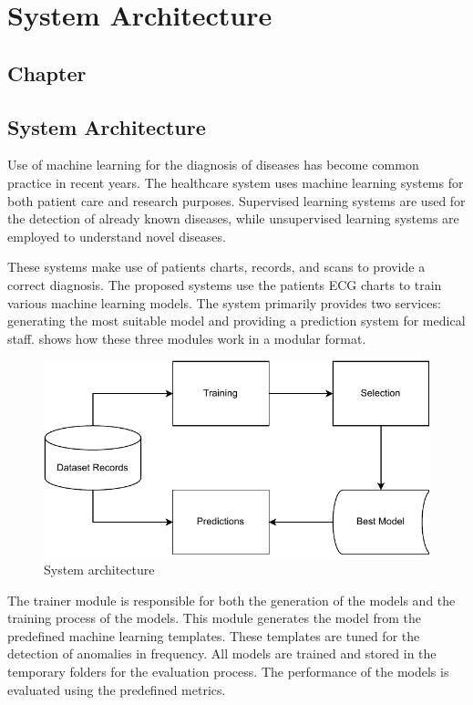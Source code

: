 \thispagestyle{fancy}
\chapter{System Architecture} \label{ch:system_architecture}
\section*{\centering Chapter \thechapter}
\section*{\centering System Architecture}

Use of machine learning for the diagnosis of diseases has become common practice in recent years. The healthcare system uses machine learning systems for both patient care and research purposes. Supervised learning systems are used for the detection of already known diseases, while unsupervised learning systems are employed to understand novel diseases.

These systems make use of patients charts, records, and scans to provide a correct diagnosis. The proposed systems use the patients ECG charts to train various machine learning models. The system primarily provides two services: generating the most suitable model and providing a prediction system for medical staff.  shows how these three modules work in a modular format.

\begin{figure}[H]
  \centering
  \includegraphics[width=0.6\columnwidth]{media/architecture/System_Architecture_v2_Compact.pdf}
  \caption{System architecture}
  \label{fig:system_architecture}
\end{figure}

The trainer module is responsible for both the generation of the models and the training process of the models. This module generates the model from the predefined machine learning templates. These templates are tuned for the detection of anomalies in frequency. All models are trained and stored in the temporary folders for the evaluation process. The performance of the models is evaluated using the predefined metrics.

